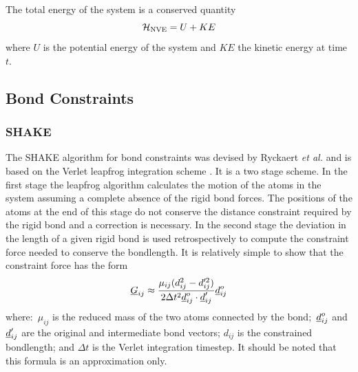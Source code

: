 The total energy of the system is a conserved quantity
\begin{equation}
{\cal H}_{\rm NVE} = U + KE
\end{equation}
where $U$ is the potential energy of the system and $KE$ the kinetic energy at time $t$.

\subsection{Bond Constraints}

\subsubsection{SHAKE}
\label{shake}

The SHAKE algorithm for bond constraints was devised by Ryckaert {\em
et al.} \cite{ryckaert-77a} and is based on the Verlet leapfrog
 integration scheme
\cite{allen-89a}. It is a two stage scheme. In the first stage the
leapfrog algorithm calculates the motion of the atoms in the system
assuming a complete absence of the rigid bond forces. The positions of the atoms at the
end of this stage do not conserve the distance constraint required by
the rigid bond and a correction is necessary.  In
the second stage the deviation in the length of a given rigid
bond is used retrospectively to compute the
constraint force needed to conserve the bondlength.  It is relatively
simple to show that the constraint force has the form
\begin{equation}
\mbox{$\underline{G}$}_{ij}\approx\frac{\mu_{ij}(d_{ij}^{2}-d_{ij}'^{2})}
{2\Delta t^{2}\mbox{$\underline{d}$}_{ij}^{o}\cdot\mbox{$\underline{d}$}_{ij}'}\mbox{$\underline{d}$}_{ij}^{o} \label{g12}
\end{equation}
where:~$\mu_{ij}$ is the reduced mass of the two atoms connected by
the bond;~$\mbox{$\underline{d}$}_{ij}^{o}$ and $\mbox{$\underline{d}$}_{ij}'$ are the original and
intermediate bond vectors; $d_{ij}$ is the constrained bondlength; and
$\Delta t$ is the Verlet integration timestep. It should be noted
that this formula is an approximation only.

